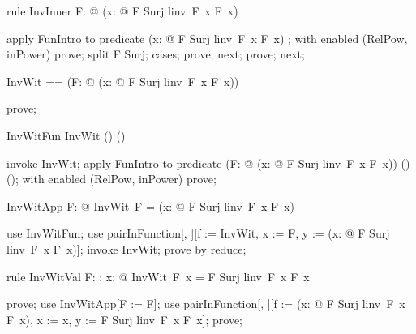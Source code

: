 \documentclass{article}
\begin{document}
\begin{theorem}{rule InvInner}
  \forall F: \nat \fun \nat @ (\lambda x: \nat @ \IF F \in Surj \THEN linv~F~x \ELSE F~x) \in \nat \fun \nat
\end{theorem}

\begin{zproof}
apply FunIntro to predicate (\lambda x: \nat @ \IF F \in Surj \THEN linv~F~x \ELSE F~x) \in \nat \fun \nat;
with enabled (RelPow, inPower) prove;
split F \in Surj;
cases;
prove;
next;
prove;
next;
\end{zproof}

\begin{zed}
  InvWit == (\lambda F: \nat \fun \nat @ (\lambda x: \nat @ \IF F \in Surj \THEN linv~F~x \ELSE F~x))
\end{zed}

\begin{zproof}
prove;
\end{zproof}

\begin{theorem}{InvWitFun}
  InvWit \in (\nat \fun \nat) \fun (\nat \fun \nat)
\end{theorem}

\begin{zproof}
invoke InvWit;
apply FunIntro to predicate (\lambda F: \nat \fun \nat @ (\lambda x: \nat @ \IF F \in Surj \THEN linv~F~x \ELSE F~x)) \in (\nat \fun \nat) \fun (\nat \fun \nat);
with enabled (RelPow, inPower) prove;
\end{zproof}

\begin{theorem}{InvWitApp}
  \forall F: \nat \fun \nat @ InvWit~F = (\lambda x: \nat @ \IF F \in Surj \THEN linv~F~x \ELSE F~x)
\end{theorem}

\begin{zproof}
use InvWitFun;
use pairInFunction[\nat \fun \nat, \nat \fun \nat][f := InvWit, x := F, y := (\lambda x: \nat @ \IF F \in Surj \THEN linv~F~x \ELSE F~x)];
invoke InvWit;
prove by reduce;
\end{zproof}

\begin{theorem}{rule InvWitVal}
  \forall F: \nat \fun \nat; x: \nat @ InvWit~F~x = \IF F \in Surj \THEN linv~F~x \ELSE F~x
\end{theorem}

\begin{zproof}
prove;
use InvWitApp[F := F];
use pairInFunction[\nat, \nat][f := (\lambda x: \nat @ \IF F \in Surj \THEN linv~F~x \ELSE F~x), x := x, y := \IF F \in Surj \THEN linv~F~x \ELSE F~x];
prove;
\end{zproof}
\end{document}
